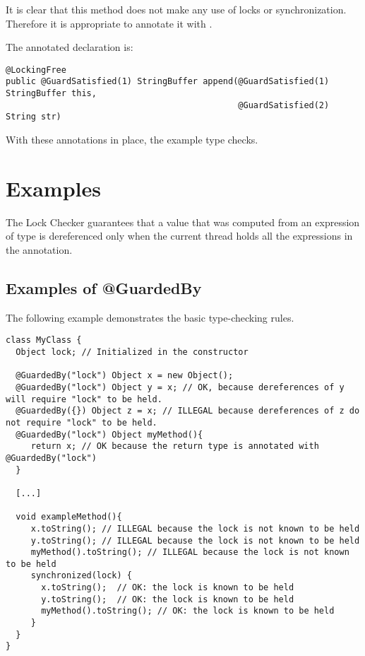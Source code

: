 It is clear that this method does not make any use of
locks or synchronization.  Therefore it is appropriate to annotate it
with .

The annotated declaration is:

\begin{verbatim}
@LockingFree
public @GuardSatisfied(1) StringBuffer append(@GuardSatisfied(1) StringBuffer this,
                                              @GuardSatisfied(2) String str)
\end{verbatim}

With these annotations in place, the example type checks.

\section{Examples\label{lock-examples}}

The Lock Checker guarantees that a value that was computed from an expression of  type is
dereferenced only when the current thread holds all the expressions in the
 annotation.

\subsection{Examples of @GuardedBy\label{lock-examples-guardedby}}

The following example demonstrates the basic
type-checking rules.

\begin{Verbatim}
class MyClass {
  Object lock; // Initialized in the constructor

  @GuardedBy("lock") Object x = new Object();
  @GuardedBy("lock") Object y = x; // OK, because dereferences of y will require "lock" to be held.
  @GuardedBy({}) Object z = x; // ILLEGAL because dereferences of z do not require "lock" to be held.
  @GuardedBy("lock") Object myMethod(){
     return x; // OK because the return type is annotated with @GuardedBy("lock")
  }

  [...]

  void exampleMethod(){
     x.toString(); // ILLEGAL because the lock is not known to be held
     y.toString(); // ILLEGAL because the lock is not known to be held
     myMethod().toString(); // ILLEGAL because the lock is not known to be held
     synchronized(lock) {
       x.toString();  // OK: the lock is known to be held
       y.toString();  // OK: the lock is known to be held
       myMethod().toString(); // OK: the lock is known to be held
     }
  }
}
\end{Verbatim}

